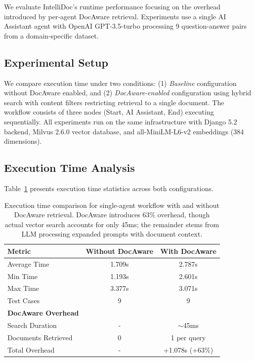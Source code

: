 \documentclass[11pt]{article}
\begin{document}
We evaluate IntelliDoc's runtime performance focusing on the overhead introduced by per-agent DocAware retrieval. Experiments use a single AI Assistant agent with OpenAI GPT-3.5-turbo processing 9 question-answer pairs from a domain-specific dataset.

\subsection{Experimental Setup}

We compare execution time under two conditions: (1) \textit{Baseline} configuration without DocAware enabled, and (2) \textit{DocAware-enabled} configuration using hybrid search with content filters restricting retrieval to a single document. The workflow consists of three nodes (Start, AI Assistant, End) executing sequentially. All experiments run on the same infrastructure with Django 5.2 backend, Milvus 2.6.0 vector database, and all-MiniLM-L6-v2 embeddings (384 dimensions).

\subsection{Execution Time Analysis}

Table~\ref{tab:performance} presents execution time statistics across both configurations.

\begin{table}[h]
\centering
\small
\begin{tabular}{lcc}
\toprule
\textbf{Metric} & \textbf{Without DocAware} & \textbf{With DocAware} \\
\midrule
Average Time & 1.709s & 2.787s \\
Min Time & 1.193s & 2.601s \\
Max Time & 3.377s & 3.071s \\
Test Cases & 9 & 9 \\
\midrule
\textbf{DocAware Overhead} & & \\
Search Duration & - & $\sim$45ms \\
Documents Retrieved & 0 & 1 per query \\
Total Overhead & - & +1.078s (+63\%) \\
\bottomrule
\end{tabular}
\caption{Execution time comparison for single-agent workflow with and without DocAware retrieval. DocAware introduces 63\% overhead, though actual vector search accounts for only 45ms; the remainder stems from LLM processing expanded prompts with document context.}
\label{tab:performance}
\end{table}
\end{document}
